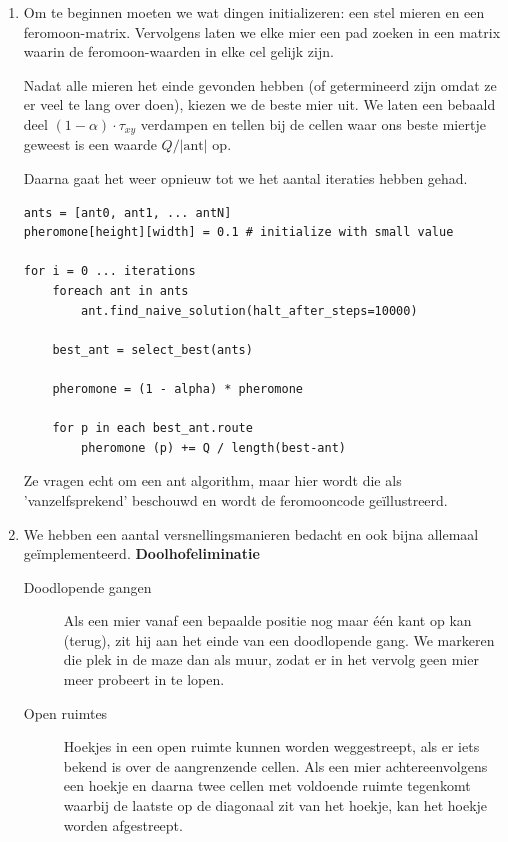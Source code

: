 \documentclass[a4paper,10pt,fleqn]{article}
\begin{document}
\begin{enumerate}[1.]
    \item Om te beginnen moeten we wat dingen initializeren: een stel mieren en een feromoon-matrix. Vervolgens laten we elke mier een pad zoeken in een matrix waarin de feromoon-waarden in elke cel gelijk zijn.

    Nadat alle mieren het einde gevonden hebben (of getermineerd zijn omdat ze er veel te lang over doen), kiezen we de beste mier uit.
    We laten een bebaald deel $(1 - \alpha) \cdot \tau_{xy}$ verdampen en tellen bij de cellen waar ons beste miertje geweest is een waarde $Q/ |\text{ant}| $ op.

    Daarna gaat het weer opnieuw tot we het aantal iteraties hebben gehad.
    \begin{lstlisting}
ants = [ant0, ant1, ... antN]
pheromone[height][width] = 0.1 # initialize with small value

for i = 0 ... iterations
    foreach ant in ants
        ant.find_naive_solution(halt_after_steps=10000)

    best_ant = select_best(ants)

    pheromone = (1 - alpha) * pheromone

    for p in each best_ant.route
        pheromone (p) += Q / length(best-ant)
\end{lstlisting}
\todo {<-}Ze vragen echt om een ant algorithm, maar hier wordt die als 'vanzelfsprekend' beschouwd en wordt de feromooncode geïllustreerd.
    \item
        We hebben een aantal versnellingsmanieren bedacht en ook bijna allemaal geïmplementeerd.
        \textbf{Doolhofeliminatie} \\
        \begin{description}
            \item[Doodlopende gangen] Als een mier vanaf een bepaalde positie nog maar één kant op kan (terug), zit hij aan het einde van een doodlopende gang. We markeren die plek in de maze dan als muur, zodat er in het vervolg geen mier meer probeert in te lopen.
            \item[Open ruimtes] Hoekjes in een open ruimte kunnen worden weggestreept, als er iets bekend is over de aangrenzende cellen. Als een mier achtereenvolgens een hoekje en daarna twee cellen met voldoende ruimte tegenkomt waarbij de laatste op de diagonaal zit van het hoekje, kan het hoekje worden afgestreept.


\end{description}
\end{enumerate}
\end{document}
